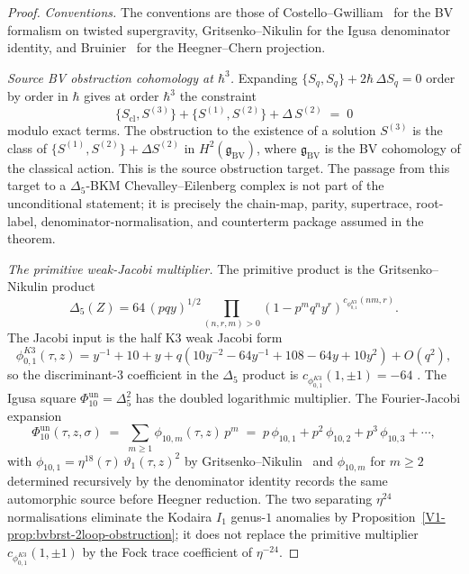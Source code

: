 \begin{proof}
\emph{Conventions.} The conventions are those of
Costello--Gwilliam~\cite{CostelloGwilliam2017,CostelloGwilliam2021}
for the BV formalism on twisted supergravity, Gritsenko--Nikulin
\cite{GritsenkoNikulin1998} for the Igusa denominator identity, and
Bruinier~\cite{Bruinier2002} for the Heegner--Chern projection.

\emph{Source BV obstruction cohomology at $\hbar^3$.}
Expanding $\{S_q, S_q\} + 2\hbar\,\Delta S_q = 0$ order by order
in $\hbar$ gives at order $\hbar^3$ the constraint
\[
 \{S_{\mathrm{cl}}, S^{(3)}\}
 + \{S^{(1)}, S^{(2)}\}
 + \Delta\,S^{(2)}
 \;=\; 0
\]
modulo exact terms. The obstruction to the existence of a solution
$S^{(3)}$ is the class of
$\{S^{(1)}, S^{(2)}\} + \Delta S^{(2)}$ in
$H^2(\mathfrak{g}_{\mathrm{BV}})$, where $\mathfrak{g}_{\mathrm{BV}}$
is the BV cohomology of the classical action. This is the source
obstruction target. The passage from this target to a
\(\Delta_5\)-BKM Chevalley--Eilenberg complex is not part of the
unconditional statement; it is precisely the chain-map, parity,
supertrace, root-label, denominator-normalisation, and counterterm
package assumed in the theorem.

\emph{The primitive weak-Jacobi multiplier.}
The primitive product is the Gritsenko--Nikulin product
\[
 \Delta_5(Z)
 =
 64\,(pqy)^{1/2}
 \prod_{(n,r,m)>0}
 (1-p^m q^n y^r)^{c_{\phi_{0,1}^{K3}}(nm,r)} .
\]
The Jacobi input is the half K3 weak Jacobi form
\[
 \phi_{0,1}^{K3}(\tau,z)
 =
 y^{-1}+10+y
 +q(10y^{-2}-64y^{-1}+108-64y+10y^2)+O(q^2),
\]
so the discriminant-\(3\) coefficient in the \(\Delta_5\) product is
\(c_{\phi_{0,1}^{K3}}(1,\pm1)=-64\)
\cite[Theorem~9.3, Table~1]{EichlerZagier1985}. The Igusa square
\(\Phi_{10}^{\mathrm{un}}=\Delta_5^2\) has the doubled logarithmic
multiplier.
The Fourier-Jacobi expansion
\[
 \Phi_{10}^{\mathrm{un}}(\tau, z, \sigma)
 \;=\;
 \sum_{m\geq 1} \phi_{10,m}(\tau, z)\,p^m
 \;=\;
 p\,\phi_{10,1} + p^2\,\phi_{10,2} + p^3\,\phi_{10,3} + \cdots,
\]
with $\phi_{10,1} = \eta^{18}(\tau)\,\vartheta_1(\tau,z)^2$ by
Gritsenko--Nikulin~\cite[Thm.~2.1]{GritsenkoNikulin1998} and
$\phi_{10,m}$ for $m\geq 2$ determined recursively by the
denominator identity records the same automorphic source before
Heegner reduction. The two separating $\eta^{24}$ normalisations eliminate the
Kodaira \(I_1\) genus-\(1\) anomalies by
Proposition~\ref{V1-prop:bvbrst-2loop-obstruction}; it does not replace
the primitive multiplier \(c_{\phi_{0,1}^{K3}}(1,\pm1)\) by the Fock trace
coefficient of $\eta^{-24}$.


\end{proof}
